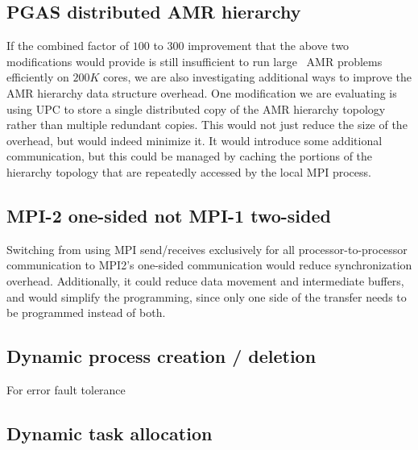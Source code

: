 \documentclass{article}
\begin{document}
\subsection{PGAS distributed AMR hierarchy} \label{solution:parallel-pgas}

 If the combined factor of $100$ to $300$ improvement that the above
 two modifications would provide is still insufficient to run large \enzo\
 AMR problems efficiently on $200K$ cores, we are also investigating
 additional ways to improve the AMR hierarchy data structure overhead.
 One modification we are evaluating is using UPC to store a single
 distributed copy of the AMR hierarchy topology rather than multiple
 redundant copies.  This would not just reduce the size of the
 overhead, but would indeed minimize it.  It would introduce some
 additional communication, but this could be managed by caching the
 portions of the hierarchy topology that are repeatedly accessed by
 the local MPI process.  

\subsection{MPI-2 one-sided not MPI-1 two-sided}  \label{solution:parallel-onesided}

  Switching from using MPI send/receives exclusively for all
  processor-to-processor communication to MPI2's one-sided
  communication would reduce synchronization overhead.  Additionally,
  it could reduce data movement and intermediate buffers, and would
  simplify the programming, since only one side of the transfer needs
  to be programmed instead of both.

\subsection{Dynamic process creation / deletion} \label{solution:parallel-dynamic-procs}

   For error fault tolerance

\subsection{Dynamic task allocation} \label{solution:parallel-dynamic-tasks}
\end{document}
